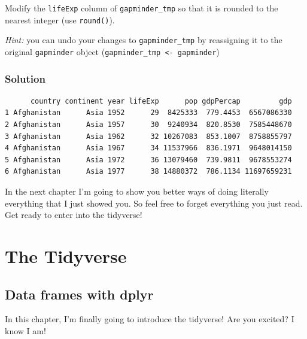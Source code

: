 \documentclass[
  letterpaper,
  DIV=11,
  numbers=noendperiod]{scrreprt}
\newenvironment{Shaded}{\begin{snugshade}}{\end{snugshade}}
\newcommand{\CommentTok}[1]{\textcolor[rgb]{0.37,0.37,0.37}{#1}}
\newcommand{\FunctionTok}[1]{\textcolor[rgb]{0.28,0.35,0.67}{#1}}
\newcommand{\NormalTok}[1]{\textcolor[rgb]{0.00,0.23,0.31}{#1}}
\newcommand{\OtherTok}[1]{\textcolor[rgb]{0.00,0.23,0.31}{#1}}
\newcommand{\SpecialCharTok}[1]{\textcolor[rgb]{0.37,0.37,0.37}{#1}}
\begin{document}
Modify the \texttt{lifeExp} column of \texttt{gapminder\_tmp} so that it
is rounded to the nearest integer (use \texttt{round()}).

\emph{Hint:} you can undo your changes to \texttt{gapminder\_tmp} by
reassigning it to the original \texttt{gapminder} object
(\texttt{gapminder\_tmp\ \textless{}-\ gapminder})

\section{Solution}

\begin{Shaded}
\end{Shaded}

\begin{verbatim}
      country continent year lifeExp      pop gdpPercap         gdp
1 Afghanistan      Asia 1952      29  8425333  779.4453  6567086330
2 Afghanistan      Asia 1957      30  9240934  820.8530  7585448670
3 Afghanistan      Asia 1962      32 10267083  853.1007  8758855797
4 Afghanistan      Asia 1967      34 11537966  836.1971  9648014150
5 Afghanistan      Asia 1972      36 13079460  739.9811  9678553274
6 Afghanistan      Asia 1977      38 14880372  786.1134 11697659231
\end{verbatim}

In the next chapter I'm going to show you better ways of doing literally
everything that I just showed you. So feel free to forget everything you
just read. Get ready to enter into the tidyverse!

\part{The Tidyverse}

\chapter{Data frames with dplyr}\label{data-frames-with-dplyr}

In this chapter, I'm finally going to introduce the tidyverse! Are you
excited? I know I am!
\end{document}
